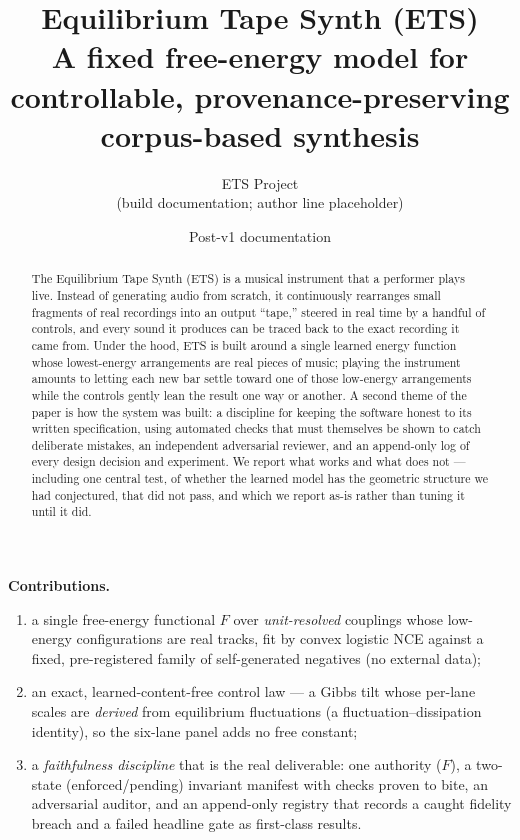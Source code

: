 \documentclass[11pt]{article}
\title{\vspace{-2.5em}\textbf{Equilibrium Tape Synth (ETS)}\\[0.35em]
  \large A fixed free-energy model for controllable, provenance-preserving
  corpus-based synthesis}
\author{ETS Project \\ \small (build documentation; author line placeholder)}
\date{Post-v1 documentation}
\begin{document}
\sloppy   %
\maketitle
\thispagestyle{fancy}

\begin{abstract}
\noindent
The Equilibrium Tape Synth (ETS) is a musical instrument that a performer plays
live. Instead of generating audio from scratch, it continuously rearranges small
fragments of real recordings into an output ``tape,'' steered in real time by a
handful of controls, and every sound it produces can be traced back to the exact
recording it came from. Under the hood, ETS is built around a single learned
energy function whose lowest-energy arrangements are real pieces of music; playing
the instrument amounts to letting each new bar settle toward one of those
low-energy arrangements while the controls gently lean the result one way or
another. A second theme of the paper is how the system was built: a discipline for
keeping the software honest to its written specification, using automated checks
that must themselves be shown to catch deliberate mistakes, an independent
adversarial reviewer, and an append-only log of every design decision and
experiment. We report what works and what does not --- including one central
test, of whether the learned model has the geometric structure we had
conjectured, that did not pass, and which we report as-is rather than tuning it
until it did.
\end{abstract}

\noindent\textbf{Contributions.}
\begin{enumerate}[label=(\roman*)]
\item a single free-energy functional $F$ over \emph{unit-resolved} couplings whose
  low-energy configurations are real tracks, fit by convex logistic NCE against a
  fixed, pre-registered family of self-generated negatives (no external data);
\item an exact, learned-content-free control law --- a Gibbs tilt whose per-lane
  scales are \emph{derived} from equilibrium fluctuations (a
  fluctuation--dissipation identity), so the six-lane panel adds no free constant;
\item a \emph{faithfulness discipline} that is the real deliverable: one authority
  ($F$), a two-state (enforced/pending) invariant manifest with checks proven to
  bite, an adversarial auditor, and an append-only registry that records a caught
  fidelity breach and a failed headline gate as first-class results.
\end{enumerate}
\end{document}

